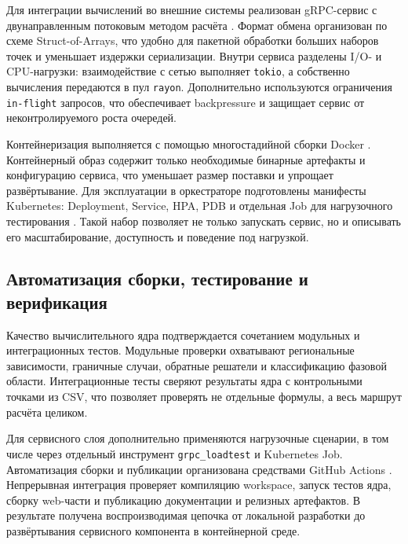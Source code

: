 Для интеграции вычислений во внешние системы реализован gRPC-сервис с
двунаправленным потоковым методом расчёта \cite{grpc_docs}.
Формат обмена организован по схеме Struct-of-Arrays, что удобно для пакетной
обработки больших наборов точек и уменьшает издержки сериализации.
Внутри сервиса разделены I/O- и CPU-нагрузки: взаимодействие с сетью выполняет
\texttt{tokio}, а собственно вычисления передаются в пул \texttt{rayon}.
Дополнительно используются ограничения \texttt{in-flight} запросов, что обеспечивает
backpressure и защищает сервис от неконтролируемого роста очередей.

Контейнеризация выполняется с помощью многостадийной сборки Docker
\cite{docker_docs}.
Контейнерный образ содержит только необходимые бинарные артефакты и конфигурацию
сервиса, что уменьшает размер поставки и упрощает развёртывание.
Для эксплуатации в оркестраторе подготовлены манифесты Kubernetes:
Deployment, Service, HPA, PDB и отдельная Job для нагрузочного тестирования
\cite{kubernetes_docs}.
Такой набор позволяет не только запускать сервис, но и описывать его масштабирование,
доступность и поведение под нагрузкой.

\subsection{Автоматизация сборки, тестирование и верификация}

Качество вычислительного ядра подтверждается сочетанием модульных и
интеграционных тестов.
Модульные проверки охватывают региональные зависимости, граничные случаи,
обратные решатели и классификацию фазовой области.
Интеграционные тесты сверяют результаты ядра с контрольными точками из CSV, что
позволяет проверять не отдельные формулы, а весь маршрут расчёта целиком.

Для сервисного слоя дополнительно применяются нагрузочные сценарии, в том числе
через отдельный инструмент \texttt{grpc\_loadtest} и Kubernetes Job.
Автоматизация сборки и публикации организована средствами GitHub Actions
\cite{github_actions_docs}.
Непрерывная интеграция проверяет компиляцию workspace, запуск тестов ядра,
сборку web-части и публикацию документации и релизных артефактов.
В результате получена воспроизводимая цепочка от локальной разработки до
развёртывания сервисного компонента в контейнерной среде.
